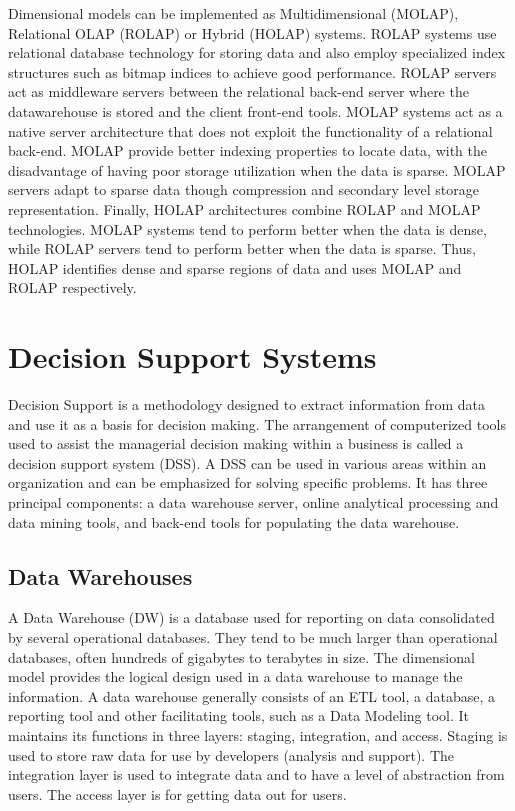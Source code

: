 \documentclass[]{article}
\begin{document}
Dimensional models can be implemented as Multidimensional (MOLAP), Relational OLAP (ROLAP) or Hybrid (HOLAP) systems. ROLAP systems use
relational database technology for storing data and also employ specialized index structures such as bitmap indices to achieve good
performance. ROLAP servers act as middleware servers between the relational back-end server where the datawarehouse is stored and the
client front-end tools. MOLAP systems act as a native server architecture that does not exploit the functionality of a relational
back-end. MOLAP provide better indexing properties to locate data, with the disadvantage of having poor storage utilization when the
data is sparse. MOLAP servers adapt to sparse data though compression and secondary level storage representation. Finally, HOLAP
architectures combine ROLAP and MOLAP technologies. MOLAP systems tend to perform better when the data is dense, while ROLAP servers
tend to perform better when the data is sparse. Thus, HOLAP identifies dense and sparse regions of data and uses MOLAP and ROLAP
respectively.



\section{Decision Support Systems} %
\label{sec:decision_support_systems}

Decision Support is a methodology designed to extract information from data and use it as a basis for decision making. The arrangement
of computerized tools used to assist the managerial decision making within a business is called a decision support system (DSS). A DSS
can be used in various areas within an organization and can be emphasized for solving specific problems. It has three principal
components: a data warehouse server, online analytical processing and data mining tools, and back-end tools for populating the data
warehouse.


\subsection{Data Warehouses} %
\label{sub:data_warehouses}

A Data Warehouse (DW) is a database used for reporting on data consolidated by several operational databases. They tend to be
much larger than operational databases, often hundreds of gigabytes to terabytes in size. The dimensional model provides the
logical design used in a data warehouse to manage the information. A data warehouse generally consists of an ETL tool, a
database, a reporting tool and other facilitating tools, such as a Data Modeling tool. It maintains its functions in three
layers: staging, integration, and access. Staging is used to store raw data for use by developers (analysis and support). The
integration layer is used to integrate data and to have a level of abstraction from users. The access layer is for getting
data out for users.
\end{document}
